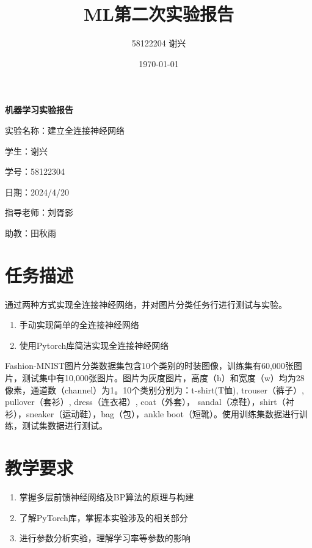 \documentclass[12pt]{article}
\title{\textbf{ML第二次实验报告}}
\author{58122204 谢兴}
\date{\today}
\begin{document}
\begin{titlepage}
    \centering
    \vspace*{60pt}
    \Huge\textbf{机器学习实验报告}

    \vspace{100pt}
    \Large
    实验名称：建立全连接神经网络

    \vspace{25pt}
    学生：谢兴

    \vspace{25pt}
    学号：58122304

    \vspace{25pt}
    日期：2024/4/20

    \vspace{25pt}
    指导老师：刘胥影

    \vspace{25pt}
    助教：田秋雨



\end{titlepage}


\newpage
\tableofcontents
	

\section{任务描述}
通过两种方式实现全连接神经网络，并对图片分类任务行进行测试与实验。
\begin{enumerate}
    \item 手动实现简单的全连接神经网络
    \item 使用Pytorch库简洁实现全连接神经网络
\end{enumerate}

Fashion-MNIST图片分类数据集包含10个类别的时装图像，训练集有60,000张图片，测试集中有10,000张图片。图片为灰度图片，高度（h）和宽度（w）均为28像素，通道数（channel）为1。10个类别分别为：t-shirt(T恤), trouser（裤子）, pullover（套衫）, dress（连衣裙）, coat（外套）， sandal（凉鞋），shirt（衬衫），sneaker（运动鞋），bag（包），ankle boot（短靴）。使用训练集数据进行训练，测试集数据进行测试。
\section{教学要求}
\begin{enumerate}
    \item 掌握多层前馈神经网络及BP算法的原理与构建
    \item 了解PyTorch库，掌握本实验涉及的相关部分
    \item 进行参数分析实验，理解学习率等参数的影响
\end{enumerate}
\end{document}
